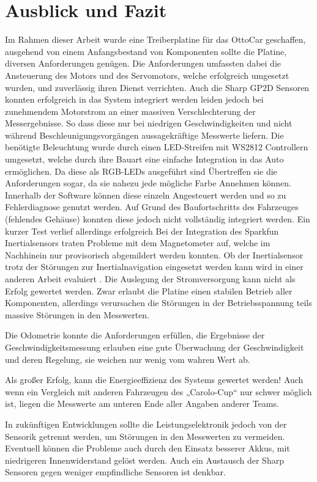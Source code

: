 \chapter{Ausblick und Fazit}

Im Rahmen dieser Arbeit wurde eine Treiberplatine für das OttoCar geschaffen, ausgehend von einem Anfangsbestand von Komponenten sollte die Platine, diversen Anforderungen genügen.
Die Anforderungen umfassten dabei die Ansteuerung des Motors und des Servomotors, welche erfolgreich umgesetzt wurden, und zuverlässig ihren Dienst verrichten.
Auch die Sharp GP2D Sensoren konnten erfolgreich in das System integriert werden leiden jedoch bei zunehmendem Motorstrom an einer massiven Verschlechterung der Messergebnisse.
So dass diese nur bei niedrigen Geschwindigkeiten und nicht während Beschleunigungsvorgängen aussagekräftige Messwerte liefern.
Die benötigte Beleuchtung wurde durch einen LED-Streifen mit WS2812 Controllern umgesetzt, welche durch ihre Bauart eine einfache Integration in das Auto ermöglichen.
Da diese als RGB-LEDs ausgeführt sind Übertreffen sie die Anforderungen sogar, da sie nahezu jede mögliche Farbe Annehmen können. Innerhalb der Software können diese einzeln Angesteuert
werden und so zu Fehlerdiagnose genutzt werden. Auf Grund des Baufortschritts des Fahrzeuges (fehlendes Gehäuse) konnten diese jedoch nicht vollständig integriert werden. Ein kurzer Test
verlief allerdings erfolgreich
Bei der Integration des Sparkfun Inertialsensors traten Probleme mit dem Magnetometer auf, welche im Nachhinein nur provisorisch abgemildert werden konnten.
Ob der Inertialsensor trotz der Störungen zur Inertialnavigation eingesetzt werden kann wird in einer anderen Arbeit evaluiert \cite{martins_arbeit}. 
Die Auslegung der Stromversorgung kann nicht als Erfolg gewertet werden. Zwar erlaubt die Platine einen stabilen Betrieb aller Komponenten, allerdings
verursachen die Störungen in der Betriebsspannung teils massive Störungen in den Messwerten. 

Die Odometrie konnte die Anforderungen erfüllen, die Ergebnisse der Geschwindigkeitsmessung erlauben eine gute Überwachung der Geschwindigkeit und deren Regelung, sie weichen nur wenig vom wahren Wert ab.

Als großer Erfolg, kann die Energieeffizienz des Systems gewertet werden! Auch wenn ein Vergleich mit anderen Fahrzeugen des „Carolo-Cup“ nur schwer möglich ist, liegen die Messwerte am unteren Ende aller Angaben anderer
Teams.

In zukünftigen Entwicklungen sollte die Leistungselektronik  jedoch von der Sensorik getrennt werden, um Störungen in den Messwerten zu vermeiden. Eventuell können die Probleme auch durch
den Einsatz besserer Akkus, mit niedrigeren Innenwiderstand gelöst werden. Auch ein Austausch der Sharp Sensoren gegen weniger empfindliche Sensoren ist denkbar. 


